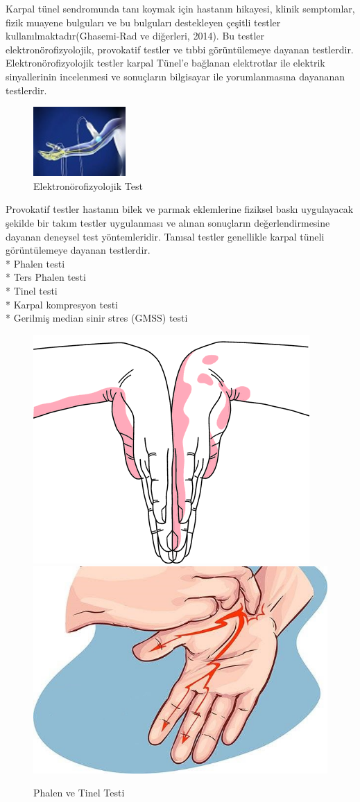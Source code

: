 \documentclass[12pt,twoside]{deuthesis}
\begin{document}
Karpal tünel sendromunda tanı koymak için hastanın hikayesi, klinik semptomlar, fizik muayene bulguları ve bu bulguları destekleyen çeşitli testler kullanılmaktadır(Ghasemi-Rad ve diğerleri, 2014).
Bu testler elektronörofizyolojik, provokatif testler ve tıbbi görüntülemeye dayanan testlerdir.
Elektronörofizyolojik testler karpal Tünel'e bağlanan elektrotlar ile elektrik sinyallerinin incelenmesi ve sonuçların bilgisayar ile yorumlanmasına dayananan testlerdir.
\begin{figure}

{\centering \includegraphics[width=1.39in]{figure/elektrod} 

}

\caption{Elektronörofizyolojik Test}\label{fig:unnamed-chunk-2}
\end{figure}
Provokatif testler hastanın bilek ve parmak eklemlerine fiziksel baskı uygulayacak şekilde bir takım
testler uygulanması ve alınan sonuçların değerlendirmesine dayanan deneysel test yöntemleridir.
Tanısal testler genellikle karpal tüneli görüntülemeye dayanan testlerdir.\\
* Phalen testi\\
* Ters Phalen testi\\
* Tinel testi\\
* Karpal kompresyon testi\\
* Gerilmiş median sinir stres (GMSS) testi\\
\begin{figure}

{\centering \includegraphics[width=0.49\linewidth,height=0.22\textheight]{figure/phalen} \includegraphics[width=0.49\linewidth,height=0.22\textheight]{figure/tinel} 

}

\caption{Phalen ve Tinel Testi}\label{fig:unnamed-chunk-3}
\end{figure}
\end{document}
